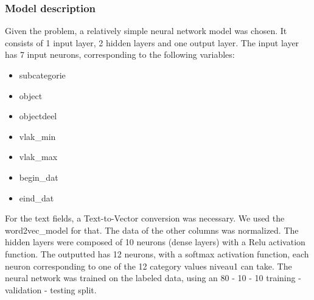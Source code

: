 \subsubsection{Model description}
Given the problem, a relatively simple neural network model was chosen. It consists of 1 input layer, 2 hidden layers and one output layer. The input layer has 7 input neurons, corresponding to the following variables:
\begin{itemize}
    \item subcategorie
    \item object
    \item objectdeel
    \item vlak\_min
    \item vlak\_max
    \item begin\_dat
    \item eind\_dat
\end{itemize}
For the text fields, a Text-to-Vector conversion was necessary. We used the word2vec\_model for that. The data of the other columns was normalized. The hidden layers were composed of 10 neurons (dense layers) with a Relu activation function. The outputted has 12 neurons, with a softmax activation function, each neuron corresponding to one of the 12 category values niveau1 can take. The neural network was trained on the labeled data, using an 80 - 10 - 10 training - validation - testing split.

